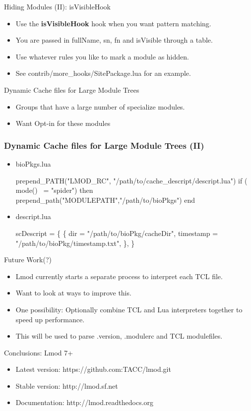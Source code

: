 \documentclass{beamer}
\begin{document}
\begin{frame}{Hiding Modules (II): isVisibleHook}
  \begin{itemize}
     \item Use the {\bf isVisibleHook} hook when you want pattern matching.
     \item You are passed in fullName, sn, fn and isVisible through a
       table.
     \item Use whatever rules you like to mark a module as hidden.
     \item See contrib/more\_hooks/SitePackage.lua for an example.
  \end{itemize}
\end{frame}

\begin{frame}{Dynamic Cache files for Large Module Trees}
  \begin{itemize}
    \item Groups that have a large number of specialize modules.
    \item Want Opt-in for these modules
  \end{itemize}
\end{frame}

\begin{frame}[fragile]
  \frametitle{Dynamic Cache files for Large Module Trees (II)}
  \begin{itemize}
    \item bioPkgs.lua
    {\tiny
\begin{semiverbatim}
  prepend\_PATH("LMOD\_RC", "/path/to/cache\_descript/descript.lua")
  if ( mode() ~= "spider") then 
     prepend\_path("MODULEPATH","/path/to/bioPkgs")
  end
\end{semiverbatim}
    }
    \item descript.lua
    {\tiny
\begin{semiverbatim}
  scDescript = \{
     \{
        dir = "/path/to/bioPkg/cacheDir",
        timestamp = "/path/to/bioPkg/timestamp.txt",
     \},
  \}
\end{semiverbatim}
    }
    \end{itemize}
\end{frame}

\begin{frame}{Future Work(?)}
  \begin{itemize}
    \item Lmod currently starts a separate process to interpret each TCL file.
    \item Want to look at ways to improve this.
    \item One possibility: Optionally combine TCL and Lua interpreters
      together to speed up performance.
    \item This will be used to parse .version, .modulerc and TCL modulefiles.
  \end{itemize}
\end{frame}


\begin{frame}{Conclusions: Lmod 7+}
  \begin{itemize}
    \item Latest version: https://github.com:TACC/lmod.git
    \item Stable version: http://lmod.sf.net
    \item Documentation:  http://lmod.readthedocs.org
  \end{itemize}
\end{frame}
\end{document}
